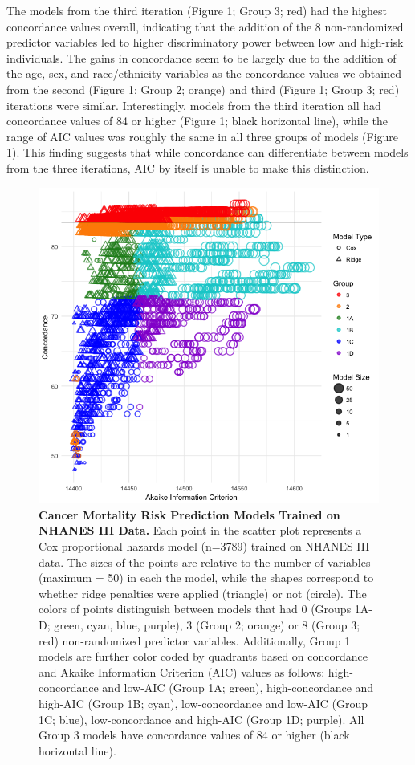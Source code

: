 \documentclass[12pt,twoside]{reedthesis}
\theoremstyle{definition}
\theoremstyle{definition}
\theoremstyle{definition}
\theoremstyle{remark}
\begin{document}
The models from the third iteration (Figure 1; Group 3; red) had the
highest concordance values overall, indicating that the addition of the
8 non-randomized predictor variables led to higher discriminatory power
between low and high-risk individuals. The gains in concordance seem to
be largely due to the addition of the age, sex, and race/ethnicity
variables as the concordance values we obtained from the second (Figure
1; Group 2; orange) and third (Figure 1; Group 3; red) iterations were
similar. Interestingly, models from the third iteration all had
concordance values of 84 or higher (Figure 1; black horizontal line),
while the range of AIC values was roughly the same in all three groups
of models (Figure 1). This finding suggests that while concordance can
differentiate between models from the three iterations, AIC by itself is
unable to make this distinction.
\begin{figure}
\centering
\includegraphics[width=1\textwidth,height=\textheight]{img/1-quad-final100dpi.png}
\caption{\textbf{Cancer Mortality Risk Prediction Models Trained on
NHANES III Data.} Each point in the scatter plot represents a Cox
proportional hazards model (n=3789) trained on NHANES III data. The
sizes of the points are relative to the number of variables (maximum =
50) in each the model, while the shapes correspond to whether ridge
penalties were applied (triangle) or not (circle). The colors of points
distinguish between models that had 0 (Groups 1A-D; green, cyan, blue,
purple), 3 (Group 2; orange) or 8 (Group 3; red) non-randomized
predictor variables. Additionally, Group 1 models are further color
coded by quadrants based on concordance and Akaike Information Criterion
(AIC) values as follows: high-concordance and low-AIC (Group 1A; green),
high-concordance and high-AIC (Group 1B; cyan), low-concordance and
low-AIC (Group 1C; blue), low-concordance and high-AIC (Group 1D;
purple). All Group 3 models have concordance values of 84 or higher
(black horizontal line).}
\end{figure}
\end{document}

